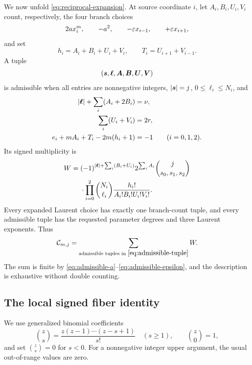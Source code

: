 \documentclass[11pt]{article}
\theoremstyle{definition}
\theoremstyle{remark}
\begin{document}
We now unfold \eqref{eq:reciprocal-expansion}.  At source coordinate \(i\),
let \(A_i,B_i,U_i,V_i\) count, respectively, the four branch choices
\[
2a x_i^m,\qquad -a^2,\qquad -\varepsilon x_{i-1},\qquad +\varepsilon x_{i+1},
\]
and set
\begin{equation}
h_i=A_i+B_i+U_i+V_i,
\qquad
T_i=U_{i+1}+V_{i-1}.
\label{eq:h-T}
\end{equation}
A tuple
\begin{equation}
(\boldsymbol{s},\boldsymbol{\ell},\boldsymbol{A},\boldsymbol{B},\boldsymbol{U},\boldsymbol{V})
\label{eq:admissible-tuple}
\end{equation}
is admissible when all entries are nonnegative integers,
\(|\boldsymbol{s}|=j\), \(0\le\ell_i\le N_i\), and
\begin{align}
|\boldsymbol{\ell}|+\sum_i(A_i+2B_i)&=\nu,
\label{eq:admissible-a}\\
\sum_i(U_i+V_i)&=2r,
\label{eq:admissible-epsilon}\\
e_i+mA_i+T_i-2m(h_i+1)&=-1
\qquad(i=0,1,2).
\label{eq:admissible-laurent}
\end{align}
Its signed multiplicity is
\begin{equation}
\begin{aligned}
W={}&(-1)^{|\boldsymbol{\ell}|+\sum_i(B_i+U_i)}
2^{\sum_iA_i}\binom{j}{s_0,s_1,s_2}\\
&\cdot\prod_{i=0}^2
\binom{N_i}{\ell_i}
\frac{h_i!}{A_i!B_i!U_i!V_i!}.
\end{aligned}
\label{eq:admissible-weight}
\end{equation}
Every expanded Laurent choice has exactly one branch-count tuple, and every
admissible tuple has the requested parameter degrees and three Laurent
exponents.  Thus
\begin{equation}
\mathcal{C}_{m,j}=\sum_{\text{admissible tuples in }\eqref{eq:admissible-tuple}}W.
\label{eq:C-admissible-sum}
\end{equation}
The sum is finite by \eqref{eq:admissible-a}--\eqref{eq:admissible-epsilon},
and the description is exhaustive without double counting.

\subsection{The local signed fiber identity}
\label{subsec:fiber-identity}

We use generalized binomial coefficients
\[
\binom{z}{s}=\frac{z(z-1)\cdots(z-s+1)}{s!}
\quad(s\ge1),
\qquad
\binom{z}{0}=1,
\]
and set \(\binom{z}{s}=0\) for \(s<0\).  For a nonnegative integer upper
argument, the usual out-of-range values are zero.
\end{document}
